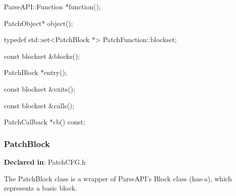 \begin{apient}
ParseAPI::Function *function();
\end{apient}




\begin{apient}
PatchObject* object();
\end{apient}


\begin{apient}
typedef std::set<PatchBlock *> PatchFunction::blockset;

const blockset &blocks();
\end{apient}



\begin{apient}
PatchBlock *entry();
\end{apient}



\begin{apient}
const blockset &exits();
\end{apient}



\begin{apient}
const blockset &calls();
\end{apient}



\begin{apient}
PatchCallback *cb() const;
\end{apient}


\subsubsection{PatchBlock}
\label{sec-3.2.10}

\textbf{Declared in}: PatchCFG.h

The PatchBlock class is a wrapper of ParseAPI's Block class (has-a), which
represents a basic block.


